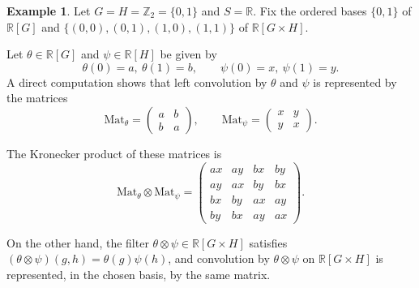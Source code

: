 \documentclass[final]{article}
\newcommand{\R}{\mathbb{R}}
\newcommand{\Z}{\mathbb{Z}}
\newcommand{\Mat}{\text{Mat}}
\theoremstyle{definition}
\newtheorem{example}[definition]{Example}
\theoremstyle{plain}
\begin{document}
\begin{example}
Let $G=H=\Z_2=\{0,1\}$ and $S=\R$.
Fix the ordered bases $\{0,1\}$ of $\R[G]$ and
$\{(0,0),(0,1),(1,0),(1,1)\}$ of $\R[G\times H]$.

Let $\theta\in \R[G]$ and $\psi\in \R[H]$ be given by
\[
\theta(0)=a,\ \theta(1)=b,
\qquad
\psi(0)=x,\ \psi(1)=y.
\]
A direct computation shows that left convolution by $\theta$ and $\psi$
is represented by the matrices
\[
\Mat_\theta=
\begin{pmatrix}
a & b\\
b & a
\end{pmatrix},
\qquad
\Mat_\psi=
\begin{pmatrix}
x & y\\
y & x
\end{pmatrix}.
\]

The Kronecker product of these matrices is
\[
\Mat_\theta\otimes \Mat_\psi=
\begin{pmatrix}
ax & ay & bx & by\\
ay & ax & by & bx\\
bx & by & ax & ay\\
by & bx & ay & ax
\end{pmatrix}.
\]

On the other hand, the filter $\theta\otimes\psi\in \R[G\times H]$ satisfies
$(\theta\otimes\psi)(g,h)=\theta(g)\psi(h)$, and convolution by
$\theta\otimes\psi$ on $\R[G\times H]$ is represented, in the chosen basis,
by the same matrix.
\end{example}
\end{document}
